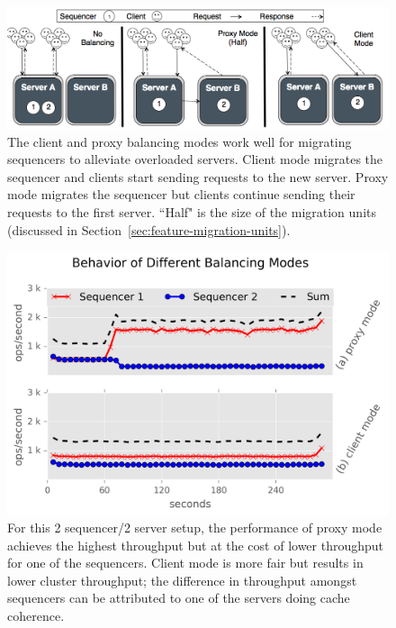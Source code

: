 \documentclass[preprint]{sigplanconf-eurosys}
\begin{document}
\begin{figure}[t!]
\centering
\includegraphics{figures/mantle-modes.png}
\caption{The client and proxy balancing modes work well for migrating
sequencers to alleviate overloaded servers. Client mode migrates the sequencer
and clients start sending requests to the new server. Proxy mode migrates the
sequencer but clients continue sending their requests to the first server.
``Half" is the size of the migration units (discussed in
Section~\ref{sec:feature-migration-units}).}\label{fig:mantle-modes}
\end{figure}

\begin{figure}[t!]
\centering
\includegraphics{figures/mantle-mode-behavior.png}
\caption{For this 2 sequencer/2 server setup, the performance of proxy mode
achieves the highest throughput but at the cost of lower throughput for one of
the sequencers. Client mode is more fair but results in lower cluster
throughput; the difference in throughput amongst sequencers can be attributed
to one of the servers doing cache coherence.
}\label{fig:mantle-mode-behavior}
\end{figure}
\end{document}
